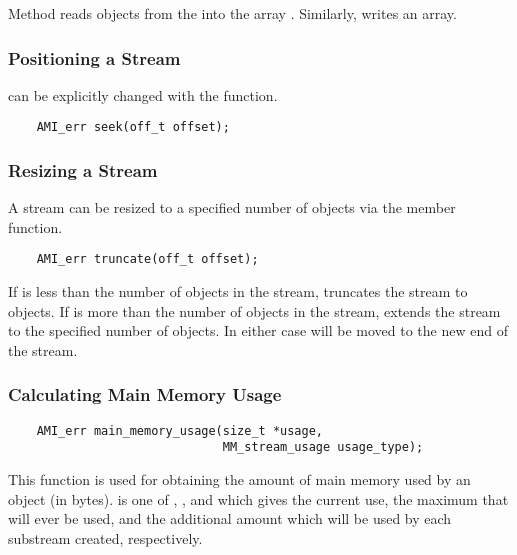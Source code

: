 Method  reads  objects from
the  into the array
. Similarly,  writes
an array. 

\subsubsection{Positioning a Stream}

 can be explicitly changed with the  function.

\begin{verbatim}
    AMI_err seek(off_t offset);
\end{verbatim}

\subsubsection{Resizing a Stream}

A stream can be resized to a specified number of objects via
the  member function.

\begin{verbatim}
    AMI_err truncate(off_t offset);
\end{verbatim}
If  is less than the number of objects in the
stream,  truncates the stream to
 objects. If  is more than the
number of objects in the stream,  extends
the stream to the specified number of objects. In either
case  will be moved to the new end of
the stream.

\subsubsection{Calculating Main Memory Usage}

\begin{verbatim}
    AMI_err main_memory_usage(size_t *usage,
                              MM_stream_usage usage_type);
\end{verbatim}

This function is used for obtaining the amount of main memory used by an
 object (in bytes).  is one of
, , and
 which gives the current use, the maximum
that will ever be used, and the additional amount which will be used
by each substream created, respectively.

